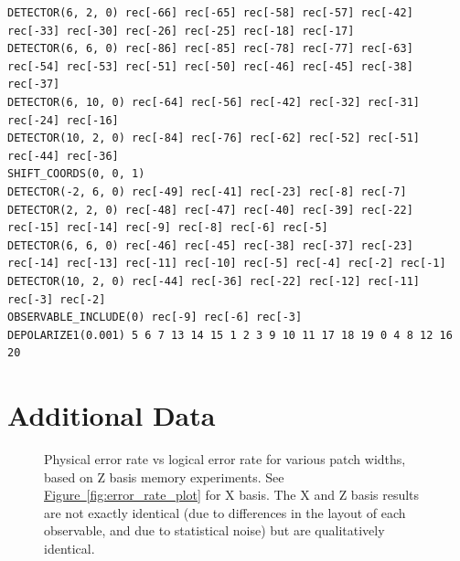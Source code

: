 \documentclass[onecolumn,unpublished,a4paper]{quantumarticle}
\theoremstyle{definition}
\theoremstyle{definition}
\theoremstyle{definition}
\newcommand{\fig}[1]{\hyperref[fig:#1]{Figure~\ref*{fig:#1}}}
\begin{document}
\begin{lstlisting}[style=stimcircuit]
DETECTOR(6, 2, 0) rec[-66] rec[-65] rec[-58] rec[-57] rec[-42] rec[-33] rec[-30] rec[-26] rec[-25] rec[-18] rec[-17]
DETECTOR(6, 6, 0) rec[-86] rec[-85] rec[-78] rec[-77] rec[-63] rec[-54] rec[-53] rec[-51] rec[-50] rec[-46] rec[-45] rec[-38] rec[-37]
DETECTOR(6, 10, 0) rec[-64] rec[-56] rec[-42] rec[-32] rec[-31] rec[-24] rec[-16]
DETECTOR(10, 2, 0) rec[-84] rec[-76] rec[-62] rec[-52] rec[-51] rec[-44] rec[-36]
SHIFT_COORDS(0, 0, 1)
DETECTOR(-2, 6, 0) rec[-49] rec[-41] rec[-23] rec[-8] rec[-7]
DETECTOR(2, 2, 0) rec[-48] rec[-47] rec[-40] rec[-39] rec[-22] rec[-15] rec[-14] rec[-9] rec[-8] rec[-6] rec[-5]
DETECTOR(6, 6, 0) rec[-46] rec[-45] rec[-38] rec[-37] rec[-23] rec[-14] rec[-13] rec[-11] rec[-10] rec[-5] rec[-4] rec[-2] rec[-1]
DETECTOR(10, 2, 0) rec[-44] rec[-36] rec[-22] rec[-12] rec[-11] rec[-3] rec[-2]
OBSERVABLE_INCLUDE(0) rec[-9] rec[-6] rec[-3]
DEPOLARIZE1(0.001) 5 6 7 13 14 15 1 2 3 9 10 11 17 18 19 0 4 8 12 16 20
\end{lstlisting}

\clearpage
\section{Additional Data}
\label{app:other_plots}

\begin{figure}[h!]
    \centering
    \caption{
        Physical error rate vs logical error rate for various patch widths, based on Z basis memory experiments.
        See \fig{error_rate_plot} for X basis.
        The X and Z basis results are not exactly identical (due to differences in the layout of each observable, and due to statistical noise) but are qualitatively identical.
    }
    \label{fig:error_rate_plot_z}
\end{figure}
\end{document}
